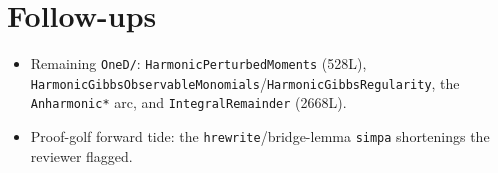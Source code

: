 \documentclass[11pt]{article}
\begin{document}
\section{Follow-ups}
\begin{itemize}[noitemsep]
  \item Remaining \texttt{OneD/}: \texttt{HarmonicPerturbedMoments} (528L),
    \texttt{HarmonicGibbsObservableMonomials}/\texttt{HarmonicGibbsRegularity}, the
    \texttt{Anharmonic*} arc, and \texttt{IntegralRemainder} (2668L).
  \item Proof-golf forward tide: the \texttt{hrewrite}/bridge-lemma \texttt{simpa} shortenings the
    reviewer flagged.
\end{itemize}
\end{document}
